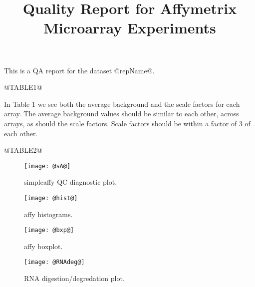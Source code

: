 \documentclass[11pt]{article}
\begin{document}
\title{Quality Report for Affymetrix Microarray Experiments}

\maketitle

This is a QA report for the dataset @repName@.

@TABLE1@

In Table 1 we see both the average background and the scale factors for each
array.  The average background values should be similar to each other, 
across arrays, as should the scale factors. Scale factors should be within
a factor of 3 of each other.


@TABLE2@




\begin{figure}[tp]
  \centering
\texttt{[image: @sA@]}

\caption{\label{fig:sA}%
simpleaffy QC diagnostic plot.}
\end{figure}

\begin{figure}[tp]
  \centering
\texttt{[image: @hist@]}
\caption{\label{fig:hist}%
affy histograms.}
\end{figure}

\begin{figure}[tp]
  \centering
\texttt{[image: @bxp@]}
\caption{\label{fig:bxp}%
affy boxplot.}
\end{figure}


\begin{figure}[tp]
  \centering
\texttt{[image: @RNAdeg@]}
\caption{\label{fig:rnadeg}%
RNA digestion/degredation plot.}
\end{figure}
\end{document}
